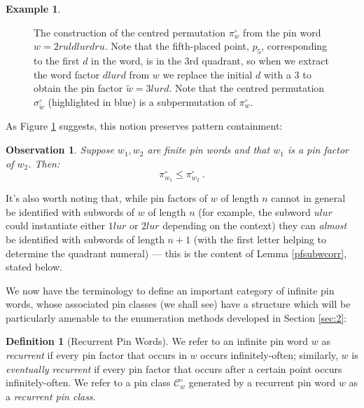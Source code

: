 \documentclass[11pt,a4paper]{article}
\newtheorem{obs}[thm]{Observation}
\theoremstyle{definition}
\newtheorem{defn}[thm]{Definition}
\newtheorem{example}[thm]{Example}
\begin{document}
\begin{example}
\begin{figure}[h]
\begin{center}
\end{center}
\caption{The construction of the centred permutation $\pi_{w}^{\circ}$ from the pin word $w = 2ruldlurdru$. Note that the fifth-placed point, $p_{5}$, corresponding to the first $d$ in the word, is in the $3$rd quadrant, so when we extract the word factor $dlurd$ from $w$ we replace the initial $d$ with a $3$ to obtain the pin factor $\tilde{w} = 3lurd$. Note that the centred permutation $\sigma_{\tilde{w}}^{\circ}$ (highlighted in blue) is a subpermutation of $\pi_{w}^{\circ}$.}
\label{fig:pinfactorexample}
\end{figure}

\end{example}

As Figure \ref{fig:pinfactorexample} suggests, this notion preserves pattern containment:

\begin{obs} \label{pinfactorcontainment}
Suppose $w_{1},w_{2}$ are finite pin words and that $w_{1}$ is a pin factor of $w_{2}$. Then:
\[
\pi^{\circ}_{w_{1}} \leq \pi^{\circ}_{w_{2}} \ .
\]
\end{obs}

It's also worth noting that, while pin factors of $w$ of length $n$ cannot in general be identified with subwords of $w$ of length $n$ (for example, the subword $ulur$ could instantiate either $1lur$ or $2lur$ depending on the context) they can \emph{almost} be identified with subwords of length $n+1$ (with the first letter helping to determine the quadrant numeral) --- this is the content of Lemma \ref{pfsubwcorr}, stated below.

We now have the terminology to define an important category of infinite pin words, whose associated pin classes (we shall see) have a structure which will be particularly amenable to the enumeration methods developed in Section \ref{sec:2}:

\begin{defn}[Recurrent Pin Words] \label{def:pinwordrecurrence}
We refer to an infinite pin word $w$ as \emph{recurrent} if every pin factor that occurs in $w$ occurs infinitely-often; similarly, $w$ is \emph{eventually recurrent} if every pin factor that occurs after a certain point occurs infinitely-often. We refer to a pin class $\mathcal{C}^{\circ}_{w}$ generated by a recurrent pin word $w$ as a \emph{recurrent pin class}.
\end{defn}
\end{document}
